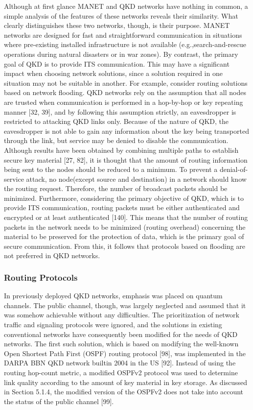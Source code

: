 Although at first glance MANET and QKD networks have nothing in common, a simple analysis of the features of these networks reveals their similarity. What clearly distinguishes these two networks, though, is their purpose. MANET networks are designed for fast and straightforward communication in situations where pre-existing installed infrastructure is not available (e.g.,search-and-rescue operations during natural disasters or in war zones). By contrast, the primary goal of QKD is to provide ITS communication. This may have a significant impact when choosing network solutions, since a solution required in one situation may not be suitable in another. For example, consider routing solutions based on network flooding. QKD networks rely on the assumption that all nodes are trusted when communication is performed in a hop-by-hop or key repeating manner [32, 39], and by following this assumption strictly, an eavesdropper is restricted to attacking QKD links only. Because of the nature of QKD, the eavesdropper is not able to gain any information about the key being transported through the link, but service may be denied to disable the communication. Although results have been obtained by combining multiple paths to establish secure key material [27, 82], it is thought that the amount of routing information being sent to the nodes should be reduced to a minimum. To prevent a denial-of-service attack, no node(except source and destination) in a network should know the routing request. Therefore, the number of broadcast packets should be minimized. Furthermore, considering the primary objective of QKD, which is to provide ITS communication, routing packets must be either authenticated and encrypted or at least authenticated [140]. This means that the number of routing packets in the network needs to be minimized (routing overhead) concerning the material to be preserved for the protection of data, which is the primary goal of secure communication. From this, it follows that protocols based on flooding are not preferred in QKD networks.
\subsubsection*{Routing Protocols}
In previously deployed QKD networks, emphasis was placed on quantum channels. The public channel, though, was largely neglected and assumed that it was somehow achievable without any difficulties. The prioritization of network traffic and signaling protocols were ignored, and the solutions in existing conventional networks have consequently been modified for the needs of QKD networks. The first such solution, which is based on modifying the well-known Open Shortest Path First (OSPF) routing protocol [98], was implemented in the DARPA BBN QKD network builtin 2004 in the US [92]. Instead of using the routing hop-count metric, a modified OSPFv2 protocol was used to determine link quality according to the amount of key material in key storage. As discussed in Section 5.1.4, the modified version of the OSPFv2 does not take into account the status of the public channel [99].

